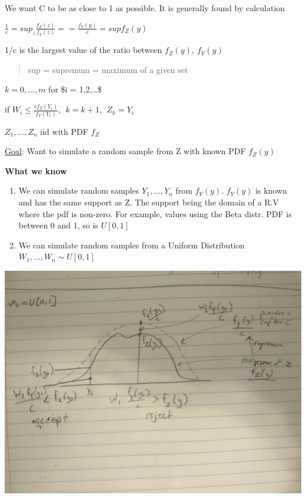 \documentclass[11pt]{article}
\begin{document}
We want C to be as close to 1 as possible. It is generally found by calculation

\(\frac{1}{c} = sup_z \frac{f_Z (z)}{f_Y (z)} == \frac{f_Y (y)}{c} = sup f_Z (y)\)

1/c is the largest value of the ratio between \(f_Z(y), \ f_Y (y)\)

\begin{quote}
sup = supremum = maximum of a given set
\end{quote}

\(k = 0, ..., m\) for \$i = 1,2,\ldots{}\$

if \(W_i \leq \frac{c f_Z(Y_i)}{f_Y (Y_i)}, \ \ k = k + 1, \ \ Z_k = Y_i\)

\(Z_1, ..., Z_n\) iid with PDF \(f_Z\)

\uline{Goal}: Want to simulate a random sample from Z with known PDF \(f_Z (y)\)

\textbf{What we know}
\begin{enumerate}
\item We can simulate random samples \(Y_1, ..., Y_n\) from \(f_Y (y)\). \(f_Y (y)\) is
known and has the same support as Z. The support being the domain of a R.V
where the pdf is non-zero. For example, values using the Beta distr. PDF is between 0 and 1,
so is \(U[0,1]\)
\item We can simulate random samples from a Uniform Distribution \(W_1, ..., W_n
   \sim U[0,1]\)
\end{enumerate}

\begin{center}
\includegraphics[width=.9\linewidth]{./resources/acceptreject.jpg}
\end{center}
\end{document}
